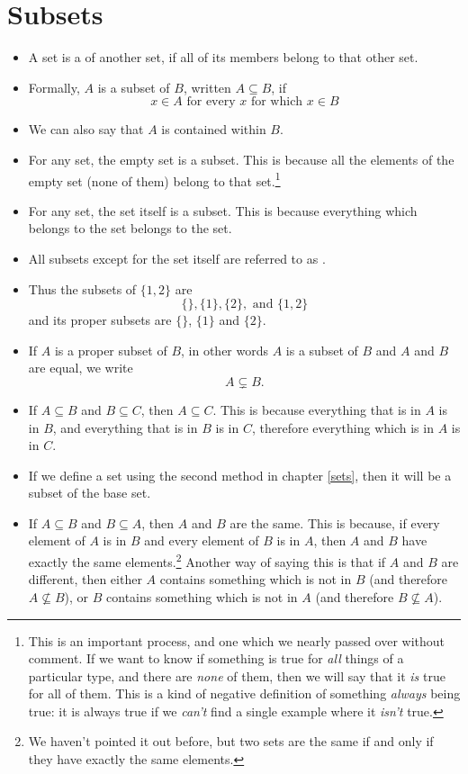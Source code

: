 \chapter{Subsets}
\label{subsets}

\begin{itemize}
\item
A set is a  of another set, if all of its members belong to that other set.
\item
Formally, $A$ is a subset of $B$, written $A \subseteq B$, if 
\[ x \in A \text{ for every } x \text{ for which } x \in B \]
\item
We can also say that $A$ is contained within $B$.
\item
For any set, the empty set is a subset. This is because all the elements of the empty set (none of them) belong to that set.\footnote{This is an important process, and one which we nearly passed over without comment. If we want to know if something is true for \emph{all} things of a particular type, and there are \emph{none} of them, then we will say that it \emph{is} true for all of them. This is a kind of negative definition of something \emph{always} being true: it is always true if we \emph{can't} find a single example where it \emph{isn't} true.} 
\item
For any set, the set itself is a subset. This is because everything which belongs to the set belongs to the set.
\item
All subsets except for the set itself are referred to as .
\item
Thus the subsets of $\{ 1, 2 \}$ are 
\[ \{\}, \{1\}, \{2\}, \text{ and } \{1, 2\} \] 
and its proper subsets are $\{\}$, $\{1\}$ and $\{2\}$.
\item
If $A$ is a proper subset of $B$, in other words $A$ is a subset of $B$ and $A$ and $B$ are  equal, we write
\[ A \varsubsetneq B .\]
\item
If $A \subseteq B$ and $B \subseteq C$, then $A \subseteq C$. This is because everything that is in $A$ is in $B$, and everything that is in $B$ is in $C$, therefore everything which is in $A$ is in $C$.
\item
If we define a set using the second method in chapter \ref{sets}, then it will be a subset of the base set. 
\item
If $A \subseteq B$ and $B \subseteq A$, then $A$ and $B$ are the same. This is because, if every element of $A$ is in $B$ and every element of $B$ is in $A$, then $A$ and $B$ have exactly the same elements.\footnote{We haven't pointed it out before, but two sets are the same if and only if they have exactly the same elements.} Another way of saying this is that if $A$ and $B$ are different, then either $A$ contains something which is not in $B$ (and therefore $A \nsubseteq B$), or $B$ contains something which is not in $A$ (and therefore $B \nsubseteq A$).

\end{itemize}

